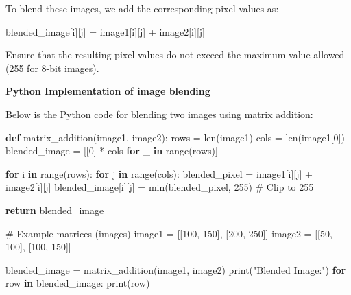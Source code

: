 \documentclass[
  letterpaper,
  DIV=11,
  numbers=noendperiod]{scrreprt}
\newenvironment{Shaded}{\begin{snugshade}}{\end{snugshade}}
\newcommand{\BuiltInTok}[1]{\textcolor[rgb]{0.00,0.23,0.31}{#1}}
\newcommand{\CommentTok}[1]{\textcolor[rgb]{0.37,0.37,0.37}{#1}}
\newcommand{\ControlFlowTok}[1]{\textcolor[rgb]{0.00,0.23,0.31}{\textbf{#1}}}
\newcommand{\DecValTok}[1]{\textcolor[rgb]{0.68,0.00,0.00}{#1}}
\newcommand{\KeywordTok}[1]{\textcolor[rgb]{0.00,0.23,0.31}{\textbf{#1}}}
\newcommand{\NormalTok}[1]{\textcolor[rgb]{0.00,0.23,0.31}{#1}}
\newcommand{\OperatorTok}[1]{\textcolor[rgb]{0.37,0.37,0.37}{#1}}
\newcommand{\StringTok}[1]{\textcolor[rgb]{0.13,0.47,0.30}{#1}}
\theoremstyle{plain}
\theoremstyle{definition}
\theoremstyle{remark}
\begin{document}
To blend these images, we add the corresponding pixel values as:

\begin{Shaded}
\begin{Highlighting}[]
\NormalTok{blended\_image[i][j] }\OperatorTok{=}\NormalTok{ image1[i][j] }\OperatorTok{+}\NormalTok{ image2[i][j]}
\end{Highlighting}
\end{Shaded}

Ensure that the resulting pixel values do not exceed the maximum value
allowed (255 for 8-bit images).

\textbf{Python Implementation of image blending}

Below is the Python code for blending two images using matrix addition:

\begin{Shaded}
\begin{Highlighting}[]
\KeywordTok{def}\NormalTok{ matrix\_addition(image1, image2):}
\NormalTok{    rows }\OperatorTok{=} \BuiltInTok{len}\NormalTok{(image1)}
\NormalTok{    cols }\OperatorTok{=} \BuiltInTok{len}\NormalTok{(image1[}\DecValTok{0}\NormalTok{])}
\NormalTok{    blended\_image }\OperatorTok{=}\NormalTok{ [[}\DecValTok{0}\NormalTok{] }\OperatorTok{*}\NormalTok{ cols }\ControlFlowTok{for}\NormalTok{ \_ }\KeywordTok{in} \BuiltInTok{range}\NormalTok{(rows)]}

    \ControlFlowTok{for}\NormalTok{ i }\KeywordTok{in} \BuiltInTok{range}\NormalTok{(rows):}
        \ControlFlowTok{for}\NormalTok{ j }\KeywordTok{in} \BuiltInTok{range}\NormalTok{(cols):}
\NormalTok{            blended\_pixel }\OperatorTok{=}\NormalTok{ image1[i][j] }\OperatorTok{+}\NormalTok{ image2[i][j]}
\NormalTok{            blended\_image[i][j] }\OperatorTok{=} \BuiltInTok{min}\NormalTok{(blended\_pixel, }\DecValTok{255}\NormalTok{)  }\CommentTok{\# Clip to 255}

    \ControlFlowTok{return}\NormalTok{ blended\_image}

\CommentTok{\# Example matrices (images)}
\NormalTok{image1 }\OperatorTok{=}\NormalTok{ [[}\DecValTok{100}\NormalTok{, }\DecValTok{150}\NormalTok{], [}\DecValTok{200}\NormalTok{, }\DecValTok{250}\NormalTok{]]}
\NormalTok{image2 }\OperatorTok{=}\NormalTok{ [[}\DecValTok{50}\NormalTok{, }\DecValTok{100}\NormalTok{], [}\DecValTok{100}\NormalTok{, }\DecValTok{150}\NormalTok{]]}

\NormalTok{blended\_image }\OperatorTok{=}\NormalTok{ matrix\_addition(image1, image2)}
\BuiltInTok{print}\NormalTok{(}\StringTok{"Blended Image:"}\NormalTok{)}
\ControlFlowTok{for}\NormalTok{ row }\KeywordTok{in}\NormalTok{ blended\_image:}
    \BuiltInTok{print}\NormalTok{(row)}
\end{Highlighting}
\end{Shaded}
\end{document}
